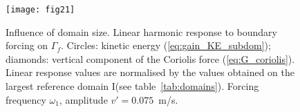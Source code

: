 \documentclass[11pt,onecolumn]{article}
\def\dom    {{\mbox{I}}}
\begin{document}
\begin{figure}[] %
\centerline{
\texttt{[image: fig21]}
}
\vspace{-0.2cm}
\caption{
Influence of domain size.
Linear harmonic response to boundary forcing on $\Gamma_f$.
Circles: kinetic energy (\ref{eq:gain_KE_subdom});  
diamonds: vertical component of the Coriolis force (\ref{eq:G_coriolis}).
Linear response values are normalised by the values obtained on the largest reference domain \dom (see table~\ref{tab:domains}).
Forcing frequency $\omega_1$, amplitude $v'=0.075$~m/s.
} 
\label{fig:cvrg_domain}
\end{figure}


%

%


\end{document}
